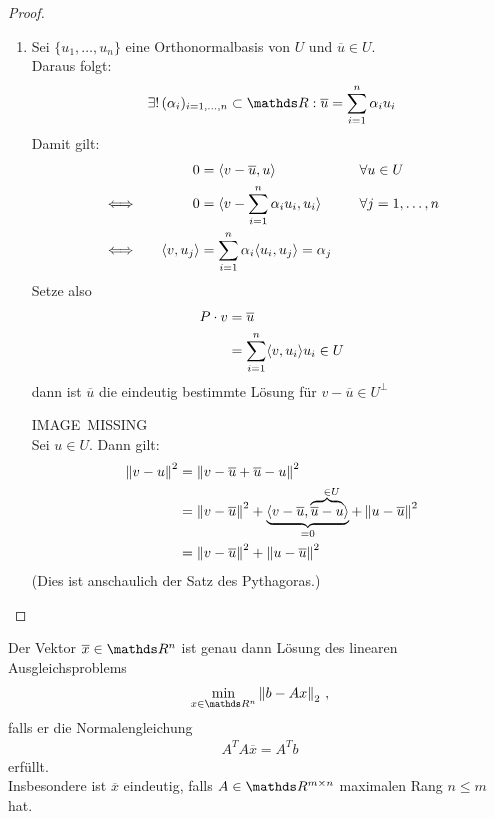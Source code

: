 \begin{proof}
	\begin{enumerate}[1)]
		\item Sei $\{u_1, \dots , u_n \}$ eine Orthonormalbasis von $U$ 
		und $\overline{u}\in U $. \\
		Daraus folgt:
		\begin{gather*}
		\exists ! \, (\alpha_i)_{i=1,\dotsc,n} \subset \R: \overline{u} = \sum_{i=1}^{n} \alpha_i u_i
		\end{gather*}
		Damit gilt:
		\begin{alignat*}{3}
		&&0 &= \langle v-\overline{u}, u \rangle &\quad& \forall u \in U \\
		&\Longleftrightarrow \quad& 0 &= \langle v- \sum_{i=1}^{n} \alpha_i u_i, u_i \rangle &\quad &\forall j=1, \dots , n\\
		&\Longleftrightarrow  & \langle v, u_j \rangle &= \sum_{i=1}^{n} \alpha_i \langle u_i, u_j \rangle = \alpha_j
		\end{alignat*}
		Setze also 
		\begin{align}
		\nonumber
		P\cdot v &= \overline{u} \\
		& = \sum_{i=1}^{n} \langle v, u_i \rangle u_i \in U
		\label{IV.3.4}
		\end{align}
		dann ist $\overline{u}$ die eindeutig bestimmte Lösung für $ v-\overline{u} \in U^\bot$
		
		IMAGE~MISSING \\
		
		Sei  $u\in U$. Dann gilt:
		\begin{align}
		\nonumber
		\left\| v-u \right\|^2 &= \left\| v-\overline{u}+\overline{u} -u \right\|^2 \\ \nonumber
		&= \left\| v-\overline{u} \right\|^2 +
		\underbrace{\langle v-\overline{u}, \overbrace{\overline{u}-u}^{~~\in U} \rangle}_{=0}
		+ \left\| u-\overline{u} \right\|^2 \\
		&= \left\| v-\overline{u} \right\|^2 + \left\| u-\overline{u} \right\|^2
		\label{IV.3.5}
		\end{align}
		(Dies ist anschaulich der Satz des Pythagoras.)
	\end{enumerate}
\end{proof}


\begin{Satze}
	Der Vektor $\overline{x} \in\R^n$ ist genau dann Lösung des linearen Ausgleichsproblems
	\begin{gather*}
	\min_{x\in\Ren} \nn{b-Ax}_2 \, ,
	\end{gather*}
	falls er die Normalengleichung
	\begin{gather}
	A^TA\overline{x} = A^Tb
	\label{IV.3.6}
	\end{gather}
	erfüllt. \\
	Insbesondere ist $\overline{x}$ eindeutig,
	falls $A\in \R^{m\times n}$ maximalen Rang $n\leq m$ hat.
\end{Satze}

